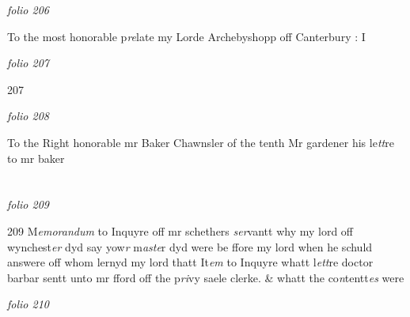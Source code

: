\documentclass[12pt, a4paper]{book}
\begin{document}
\dotfill
					

\textit{folio 206}


To the most honorable p\textit{re}late my Lorde Archebyshopp off Canterbury : I

\dotfill
					

\textit{folio 207}


{\color{Mahogany}207}

\dotfill
					

\textit{folio 208}


To the Right honorable mr Baker Chawnsler of the tenth  Mr gardener his le\textit{tt}re  to mr baker

\dotfill
					  \section*{}  \subsection*{}

\textit{folio 209}



{\color{Mahogany}209} M\textit{emorandum} to Inquyre off mr schethers \textit{ser}vantt why my lord off wynchest\textit{er} dyd say yow\textit{r} m\textit{aste}r dyd were be ffore my lord when he schuld answere off whom lernyd my lord thatt It\textit{em} to Inquyre whatt l\textit{ett}re doctor barbar sentt unto mr fford off the p\textit{ri}vy saele clerke. \& whatt  the co\textit{n}tentt\textit{es} were

\dotfill
					

\textit{folio 210}


         \vspace{4cm}
         
\dotfill
					  \section*{}  \subsection*{}
\end{document}
